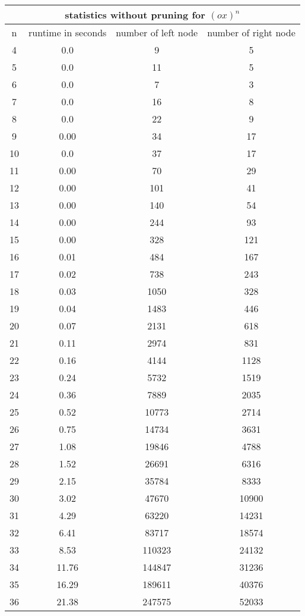 \begin{tabular}{|c|c|c|c|} \hline 
\multicolumn{4}{|c|}{statistics without pruning for $(ox)^n$}\\ \hline
n & runtime in seconds & number of left node & number of right node\\ \hline
4 & 0.0 & 9 & 5\\ \hline
5 & 0.0 & 11 & 5\\ \hline
6 & 0.0 & 7 & 3\\ \hline
7 & 0.0 & 16 & 8\\ \hline
8 & 0.0 & 22 & 9\\ \hline
9 & 0.00 & 34 & 17\\ \hline
10 & 0.0 & 37 & 17\\ \hline
11 & 0.00 & 70 & 29\\ \hline
12 & 0.00 & 101 & 41\\ \hline
13 & 0.00 & 140 & 54\\ \hline
14 & 0.00 & 244 & 93\\ \hline
15 & 0.00 & 328 & 121\\ \hline
16 & 0.01 & 484 & 167\\ \hline
17 & 0.02 & 738 & 243\\ \hline
18 & 0.03 & 1050 & 328\\ \hline
19 & 0.04 & 1483 & 446\\ \hline
20 & 0.07 & 2131 & 618\\ \hline
21 & 0.11 & 2974 & 831\\ \hline
22 & 0.16 & 4144 & 1128\\ \hline
23 & 0.24 & 5732 & 1519\\ \hline
24 & 0.36 & 7889 & 2035\\ \hline
25 & 0.52 & 10773 & 2714\\ \hline
26 & 0.75 & 14734 & 3631\\ \hline
27 & 1.08 & 19846 & 4788\\ \hline
28 & 1.52 & 26691 & 6316\\ \hline
29 & 2.15 & 35784 & 8333\\ \hline
30 & 3.02 & 47670 & 10900\\ \hline
31 & 4.29 & 63220 & 14231\\ \hline
32 & 6.41 & 83717 & 18574\\ \hline
33 & 8.53 & 110323 & 24132\\ \hline
34 & 11.76 & 144847 & 31236\\ \hline
35 & 16.29 & 189611 & 40376\\ \hline
36 & 21.38 & 247575 & 52033\\ \hline

\end{tabular}
